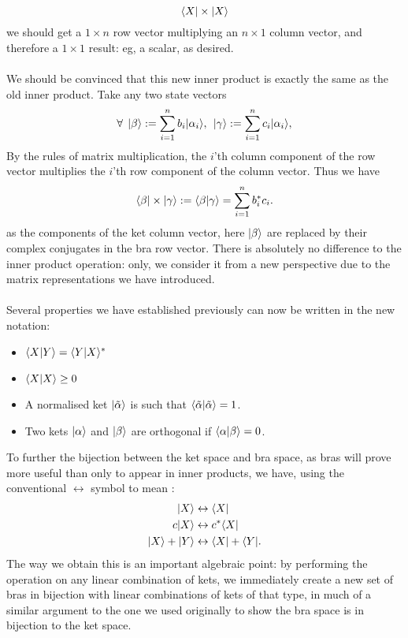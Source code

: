 $$
\langle X| \times |X\rangle
$$
we should get a $1\times n$ row vector multiplying an $n\times 1$ column vector, and therefore a $1\times 1$ result: eg, a scalar, as desired. 
\\\\
We should be convinced that this new inner product is exactly the same as the old inner product. Take any two state vectors
$$
\forall\:\:|\beta\rangle:=\sum_{i=1}^{n}b_{i}|\alpha_{i}\rangle, \:\: |\gamma\rangle:=\sum_{i=1}^{n}c_{i}|\alpha_{i}\rangle,
$$
By the rules of matrix multiplication, the  $i$'th column component of the row vector multiplies the $i$'th row component of the column vector. Thus we have
$$
\langle\beta|\times|\gamma\rangle:=\langle\beta|\gamma\rangle=\sum_{i=1}^{n}b^{\ast}_{i}c_{i}.
$$
as the components of the ket column vector, here $|\beta\rangle$ are replaced by their complex conjugates in the bra row vector. There is absolutely no difference to the inner product operation: only, we consider it from a new perspective due to the matrix representations we have introduced.
\\\\
Several properties we have established previously can now be written in the new notation:
\begin{itemize}
    \item $\langle X|Y\rangle=\langle Y|X\rangle^{\ast}$
    \item $\langle X|X\rangle\geq0$
    \item A normalised ket $|\Tilde{\alpha}\rangle$ is such that $\langle\Tilde{\alpha}|{\Tilde{\alpha}}\rangle=1$.
    \item Two kets $|\alpha\rangle$ and $|\beta\rangle$ are orthogonal if $\langle\alpha|\beta\rangle=0$.
\end{itemize}
To further the bijection between the ket space and bra space, as bras will prove more useful than only to appear in inner products, we have, using the conventional $\leftrightarrow$ symbol to mean :
$$
\begin{aligned}
|X\rangle&\leftrightarrow\langle X|\\
c|X\rangle&\leftrightarrow c^{\ast}\langle X|\\
|X\rangle+|Y\rangle&\leftrightarrow \langle X|+\langle Y|.\\
\end{aligned}
$$
The way we obtain this is an important algebraic point: by performing the operation  on any linear combination of kets, we immediately create a new set of bras in bijection with linear combinations of kets of that type, in much of a similar argument to the one we used originally to show the bra space is in bijection to the ket space.
